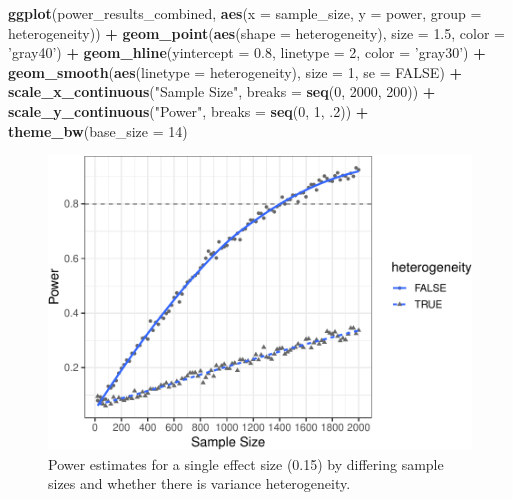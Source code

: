 \documentclass[man,mask,floatsintext]{apa6}
\newenvironment{Shaded}{\begin{snugshade}}{\end{snugshade}}
\newcommand{\DataTypeTok}[1]{\textcolor[rgb]{0.13,0.29,0.53}{#1}}
\newcommand{\DecValTok}[1]{\textcolor[rgb]{0.00,0.00,0.81}{#1}}
\newcommand{\FloatTok}[1]{\textcolor[rgb]{0.00,0.00,0.81}{#1}}
\newcommand{\KeywordTok}[1]{\textcolor[rgb]{0.13,0.29,0.53}{\textbf{#1}}}
\newcommand{\NormalTok}[1]{#1}
\newcommand{\OperatorTok}[1]{\textcolor[rgb]{0.81,0.36,0.00}{\textbf{#1}}}
\newcommand{\OtherTok}[1]{\textcolor[rgb]{0.56,0.35,0.01}{#1}}
\newcommand{\StringTok}[1]{\textcolor[rgb]{0.31,0.60,0.02}{#1}}
\begin{document}
\begin{Shaded}
\begin{Highlighting}[]
\KeywordTok{ggplot}\NormalTok{(power_results_combined, }\KeywordTok{aes}\NormalTok{(}\DataTypeTok{x =}\NormalTok{ sample_size, }\DataTypeTok{y =}\NormalTok{ power, }
                          \DataTypeTok{group =}\NormalTok{ heterogeneity)) }\OperatorTok{+}\StringTok{ }
\StringTok{  }\KeywordTok{geom_point}\NormalTok{(}\KeywordTok{aes}\NormalTok{(}\DataTypeTok{shape =}\NormalTok{ heterogeneity), }\DataTypeTok{size =} \FloatTok{1.5}\NormalTok{, }\DataTypeTok{color =} \StringTok{'gray40'}\NormalTok{) }\OperatorTok{+}\StringTok{ }
\StringTok{  }\KeywordTok{geom_hline}\NormalTok{(}\DataTypeTok{yintercept =} \FloatTok{0.8}\NormalTok{, }\DataTypeTok{linetype =} \DecValTok{2}\NormalTok{, }\DataTypeTok{color =} \StringTok{'gray30'}\NormalTok{) }\OperatorTok{+}\StringTok{ }
\StringTok{  }\KeywordTok{geom_smooth}\NormalTok{(}\KeywordTok{aes}\NormalTok{(}\DataTypeTok{linetype =}\NormalTok{ heterogeneity), }\DataTypeTok{size =} \DecValTok{1}\NormalTok{, }\DataTypeTok{se =} \OtherTok{FALSE}\NormalTok{) }\OperatorTok{+}
\StringTok{  }\KeywordTok{scale_x_continuous}\NormalTok{(}\StringTok{"Sample Size"}\NormalTok{, }\DataTypeTok{breaks =} \KeywordTok{seq}\NormalTok{(}\DecValTok{0}\NormalTok{, }\DecValTok{2000}\NormalTok{, }\DecValTok{200}\NormalTok{)) }\OperatorTok{+}\StringTok{ }
\StringTok{  }\KeywordTok{scale_y_continuous}\NormalTok{(}\StringTok{"Power"}\NormalTok{, }\DataTypeTok{breaks =} \KeywordTok{seq}\NormalTok{(}\DecValTok{0}\NormalTok{, }\DecValTok{1}\NormalTok{, }\FloatTok{.2}\NormalTok{)) }\OperatorTok{+}
\StringTok{  }\KeywordTok{theme_bw}\NormalTok{(}\DataTypeTok{base_size =} \DecValTok{14}\NormalTok{)}
\end{Highlighting}
\end{Shaded}

\begin{figure}
\centering
\includegraphics{power_simulation_files/figure-latex/simglm-power-curve-h-1.pdf}
\caption{\label{fig:simglm-power-curve-h}Power estimates for a single effect size (0.15) by differing sample sizes and whether there is variance heterogeneity.}
\end{figure}
\end{document}
